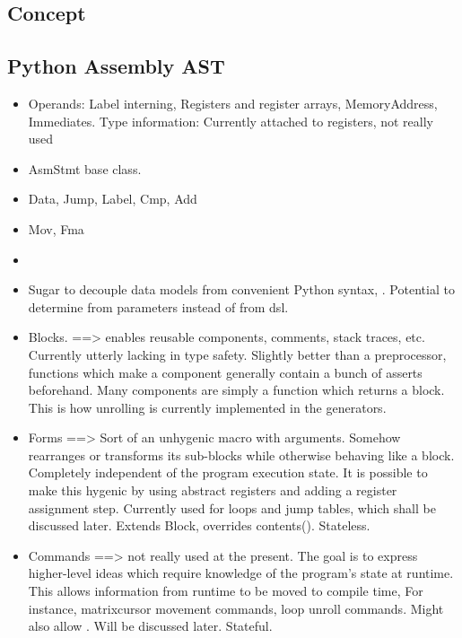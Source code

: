 \subsection{Concept}
\subsection{Python Assembly AST}
\begin{itemize}
  \item Operands: Label interning, Registers and register arrays, MemoryAddress, Immediates. Type information: Currently attached to registers, not really used

  \item AsmStmt base class. 
  \item Data, Jump, Label, Cmp, Add
  \item Mov, Fma
  \item

  \item Sugar to decouple data models from convenient Python syntax,
    . Potential to determine from parameters instead of from dsl. 

  \item Blocks. ==> enables reusable components, comments, stack traces, etc. Currently utterly lacking in type safety. Slightly better than a preprocessor, functions which make a component generally contain a bunch of asserts beforehand. Many components are simply a function which returns a block. This is how unrolling is currently implemented in the generators.

  \item Forms ==> Sort of an unhygenic macro with arguments. Somehow rearranges or transforms its sub-blocks while otherwise behaving like a block. Completely independent of the program execution state. It is possible to make this hygenic by using abstract registers and adding a register assignment step. Currently used for loops and jump tables, which shall be discussed later. Extends Block, overrides contents(). Stateless.

  \item Commands ==> not really used at the present. The goal is to express higher-level ideas which require knowledge of the program's state at runtime. This allows information from runtime to be moved to compile time, For instance, matrixcursor movement commands, loop unroll commands. Might also allow . Will be discussed later. Stateful.

\end{itemize}

